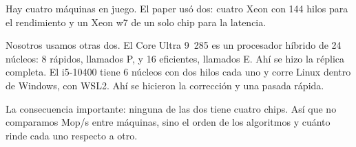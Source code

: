 Hay cuatro máquinas en juego. El paper usó dos: cuatro Xeon con 144 hilos para el rendimiento y un Xeon w7 de un solo chip para la latencia.

Nosotros usamos otras dos. El Core Ultra 9~285 es un procesador híbrido de 24 núcleos: 8 rápidos, llamados P, y 16 eficientes, llamados E. Ahí se hizo la réplica completa. El i5-10400 tiene 6 núcleos con dos hilos cada uno y corre Linux dentro de Windows, con WSL2. Ahí se hicieron la corrección y una pasada rápida.

La consecuencia importante: ninguna de las dos tiene cuatro chips. Así que no comparamos Mop/s entre máquinas, sino el orden de los algoritmos y cuánto rinde cada uno respecto a otro.
